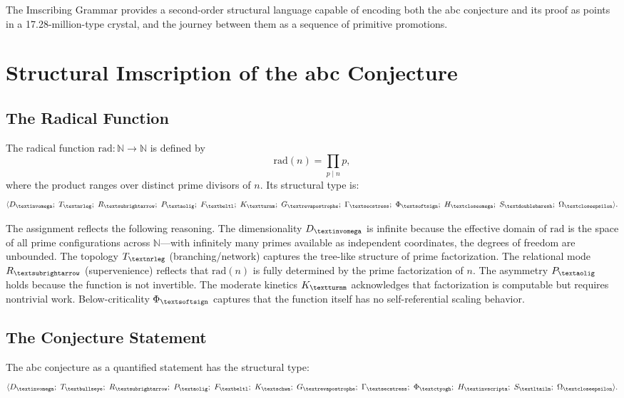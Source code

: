 \documentclass[12pt]{article}
\newcommand{\invomega}{\text{\textinvomega}}
\newcommand{\nrleg}{\text{\textnrleg}}
\newcommand{\igsubrightarrow}{\text{\textsubrightarrow}}
\newcommand{\aolig}{\text{\textaolig}}
\newcommand{\beltl}{\text{\textbeltl}}
\newcommand{\turnm}{\text{\textturnm}}
\newcommand{\revapostrophe}{\text{\textrevapostrophe}}
\newcommand{\secstress}{\text{\textsecstress}}
\newcommand{\softsign}{\text{\textsoftsign}}
\newcommand{\closeomega}{\text{\textcloseomega}}
\newcommand{\doublebaresh}{\text{\textdoublebaresh}}
\newcommand{\closeepsilon}{\text{\textcloseepsilon}}
\newcommand{\igbullseye}{\text{\textbullseye}}
\newcommand{\igschwa}{\text{\textschwa}}
\newcommand{\ctyogh}{\text{\textctyogh}}
\newcommand{\invscripta}{\text{\textinvscripta}}
\newcommand{\ltailm}{\text{\textltailm}}
\begin{document}
The Imscribing Grammar provides a second-order structural language capable of encoding both the abc conjecture and its proof as points in a 17.28-million-type crystal, and the journey between them as a sequence of primitive promotions.

\section{Structural Imscription of the abc Conjecture}

\subsection{The Radical Function}

The radical function $\text{rad}: \mathbb{N} \to \mathbb{N}$ is defined by
\begin{equation}
\text{rad}(n) = \prod_{p \mid n} p,
\end{equation}
where the product ranges over distinct prime divisors of $n$. Its structural type is:
\begin{equation}
\langle D_{\invomega};\ T_{\nrleg};\ R_{\igsubrightarrow};\ P_{\aolig};\ F_{\beltl};\ K_{\turnm};\ G_{\revapostrophe};\ \Gamma_{\secstress};\ \Phi_{\softsign};\ H_{\closeomega};\ S_{\doublebaresh};\ \Omega_{\closeepsilon} \rangle.
\end{equation}

The assignment reflects the following reasoning. The dimensionality $D_{\invomega}$ is infinite because the effective domain of $\text{rad}$ is the space of all prime configurations across $\mathbb{N}$---with infinitely many primes available as independent coordinates, the degrees of freedom are unbounded. The topology $T_{\nrleg}$ (branching/network) captures the tree-like structure of prime factorization. The relational mode $R_{\igsubrightarrow}$ (supervenience) reflects that $\text{rad}(n)$ is fully determined by the prime factorization of $n$. The asymmetry $P_{\aolig}$ holds because the function is not invertible. The moderate kinetics $K_{\turnm}$ acknowledges that factorization is computable but requires nontrivial work. Below-criticality $\Phi_{\softsign}$ captures that the function itself has no self-referential scaling behavior.

\subsection{The Conjecture Statement}

The abc conjecture as a quantified statement has the structural type:
\begin{equation}
\langle D_{\invomega};\ T_{\igbullseye};\ R_{\igsubrightarrow};\ P_{\aolig};\ F_{\beltl};\ K_{\igschwa};\ G_{\revapostrophe};\ \Gamma_{\secstress};\ \Phi_{\ctyogh};\ H_{\invscripta};\ S_{\ltailm};\ \Omega_{\closeepsilon} \rangle.
\end{equation}
\end{document}
